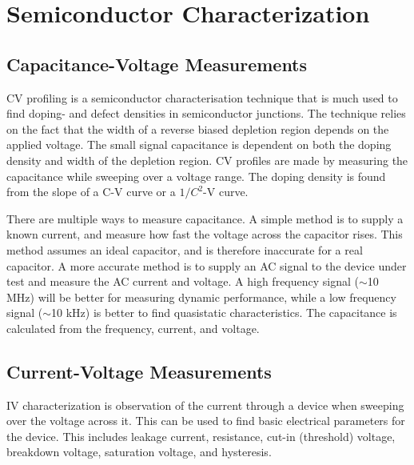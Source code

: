 \documentclass[../main/thesis.tex]{subfiles}
\begin{document}



\section{Semiconductor Characterization}
\label{t-char}

\subsection{Capacitance-Voltage Measurements}
\label{t-cv}
\gls{CV} profiling is a semiconductor characterisation technique that is much used to find doping- and defect densities in semiconductor junctions. The technique relies on the fact that the width of a reverse biased depletion region depends on the applied voltage. The small signal capacitance is dependent on both the doping density and width of the depletion region. \gls{CV} profiles are made by measuring the capacitance while sweeping over a voltage range. The doping density is found from the slope of a C-V curve or a $1/C^2$-V curve. \citep[chap. 2]{Schroder}

There are multiple ways to measure capacitance. A simple method is to supply a known current, and measure how fast the voltage across the capacitor rises. This method assumes an ideal capacitor, and is therefore inaccurate for a real capacitor. A more accurate method is to supply an AC signal to the device under test and measure the AC current and voltage. A high frequency signal ($\sim$10 MHz) will be better for measuring dynamic performance, while a low frequency signal ($\sim$10 kHz) is better to find quasistatic characteristics. The capacitance is calculated from the frequency, current, and voltage. 


\subsection{Current-Voltage Measurements}
\label{t-iv}
\gls{IV} characterization is observation of the current through a device when sweeping over the voltage across it. This can be used to find basic electrical parameters for the device. This includes leakage current, resistance, cut-in (threshold) voltage, breakdown voltage, saturation voltage, and hysteresis. 
\end{document}
